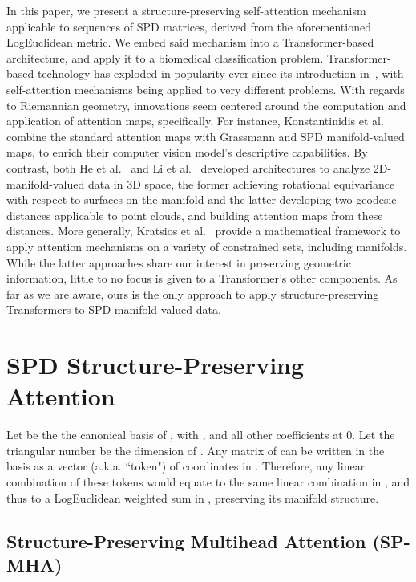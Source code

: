 \documentclass{article}
\begin{document}
In this paper, we present a structure-preserving self-attention mechanism applicable to sequences of SPD matrices, derived from the aforementioned LogEuclidean metric. We embed said mechanism into a Transformer-based architecture, and apply it to a biomedical classification problem.
Transformer-based technology has exploded in popularity ever since its introduction in~\cite{transformers}, with self-attention mechanisms being applied to very different problems.
With regards to Riemannian geometry, innovations seem centered around the computation and application of attention maps, specifically. For instance, Konstantinidis et al.~\cite{Konstantinidis2022MultimanifoldAF} combine the standard attention maps with Grassmann and SPD manifold-valued maps, to enrich their computer vision model's descriptive capabilities. By contrast, both He et al.~\cite{he_gauge_equivariant} and Li et al.~\cite{li2022geodesic} developed architectures to analyze 2D-manifold-valued data in 3D space, the former achieving rotational equivariance with respect to surfaces on the manifold and the latter developing two geodesic distances applicable to point clouds, and building attention maps from these distances. More generally, Kratsios et al.~\cite{kratsios2022universal} provide a mathematical framework to apply attention mechanisms on a variety of constrained sets, including manifolds.
While the latter approaches share our interest in preserving geometric information, little to no focus is given to a Transformer's other components. As far as we are aware, ours is the only approach to apply structure-preserving Transformers to SPD manifold-valued data.


\section{SPD Structure-Preserving Attention}
\label{sec:theory}

Let  be the the canonical basis of , with , and all other coefficients at 0. Let the triangular number  be the dimension of .
Any matrix  of  can be written in the basis  as a vector (a.k.a. ``token") of coordinates in . Therefore, any linear combination of these tokens would equate to the same linear combination in , and thus to a LogEuclidean weighted sum in , preserving its manifold structure.


\subsection{Structure-Preserving Multihead Attention (SP-MHA)}
\label{ssec:SPMHA}
\end{document}

